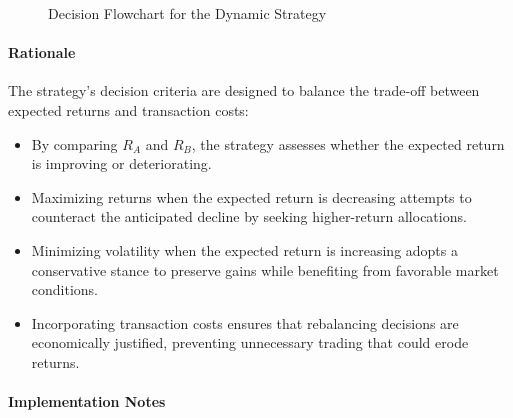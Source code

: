 \begin{figure}[htbp]
\caption{Decision Flowchart for the Dynamic Strategy}
\end{figure}


\paragraph{Rationale}

The strategy's decision criteria are designed to balance the trade-off between expected returns and transaction costs:

\begin{itemize}
    \item By comparing \( R_A \) and \( R_B \), the strategy assesses whether the expected return is improving or deteriorating.
    \item Maximizing returns when the expected return is decreasing attempts to counteract the anticipated decline by seeking higher-return allocations.
    \item Minimizing volatility when the expected return is increasing adopts a conservative stance to preserve gains while benefiting from favorable market conditions.
    \item Incorporating transaction costs ensures that rebalancing decisions are economically justified, preventing unnecessary trading that could erode returns.
\end{itemize}

\paragraph{Implementation Notes}

